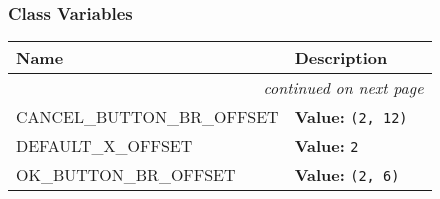 
  \subsubsection{Class Variables}

\begin{longtable}{|p{}|p{}|l}
\cline{1-2}
\cline{1-2} \centering \textbf{Name} & \centering \textbf{Description}& \\
\cline{1-2}
\endhead\cline{1-2}\multicolumn{3}{r}{\small\textit{continued on next page}}\\\endfoot\cline{1-2}
\endlastfoot\raggedright C\-A\-N\-C\-E\-L\-\_\-B\-U\-T\-T\-O\-N\-\_\-B\-R\-\_\-O\-F\-F\-S\-E\-T\- & \raggedright \textbf{Value:} 
{\tt \texttt{(}2\texttt{, }12\texttt{)}}&\\
\cline{1-2}
\raggedright D\-E\-F\-A\-U\-L\-T\-\_\-X\-\_\-O\-F\-F\-S\-E\-T\- & \raggedright \textbf{Value:} 
{\tt 2}&\\
\cline{1-2}
\raggedright O\-K\-\_\-B\-U\-T\-T\-O\-N\-\_\-B\-R\-\_\-O\-F\-F\-S\-E\-T\- & \raggedright \textbf{Value:} 
{\tt \texttt{(}2\texttt{, }6\texttt{)}}&\\
\cline{1-2}
\end{longtable}

